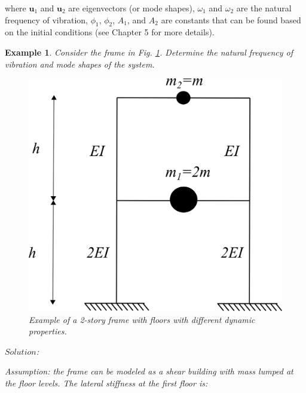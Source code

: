 \documentclass[12pt,letter]{article}
\newtheorem{ex}{Example}
\numberwithin{ex}{section} %
\newenvironment{example}{\begin{mdframed}[middlelinewidth=0.5mm]\begin{ex}\normalfont}{\end{ex}\end{mdframed}}
\numberwithin{re}{section} %
\numberwithin{vcs}{section} %
\begin{document}
\noindent where $\mathbf{u}_1$ and  $\mathbf{u}_2$ are eigenvectors (or mode shapes), $\omega_1$ and $\omega_2$ are the natural frequency of vibration, 
$\phi_1$, $\phi_2$, $A_1$, and $A_2$ are constants that can be found based on the initial conditions (see Chapter 5 for more details).

\vspace{4ex}

		
\begin{example}

Consider the frame in Fig. \ref{fig:two_story_frame_ex}. Determine the natural frequency of vibration and mode shapes of the system.

\begin{figure}[H]
	\centering
	\includegraphics{../figures/two_story_frame_example.png}
	\caption{Example of a 2-story frame with floors with different dynamic properties.}
	\label{fig:two_story_frame_ex}
\end{figure}




\noindent $Solution$:

\vspace{1ex}
	
Assumption: the frame can be modeled as a shear building with mass lumped at the floor levels. The lateral stiffness at the first floor is:


\end{example}
\end{document}

